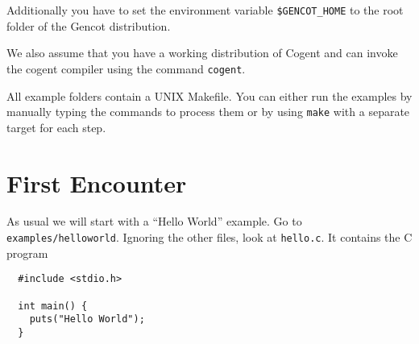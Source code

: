 \documentclass[a4paper]{report}
\newcommand{\code}[1]{\textnormal{\texttt{#1}}}
\begin{document}
Additionally you have to set the environment variable \code{\$GENCOT\_HOME} to the root folder of the Gencot
distribution.

We also assume that you have a working distribution of Cogent and can invoke the cogent compiler using the
command \code{cogent}.

All example folders contain a UNIX Makefile. You can either run the examples by manually typing the commands
to process them or by using \code{make} with a separate target for each step.

\section{First Encounter}
\label{intro-first}

As usual we will start with a ``Hello World'' example. Go to \code{examples/helloworld}. Ignoring the other files,
look at \code{hello.c}. It contains the C program
\begin{verbatim}
  #include <stdio.h>

  int main() {
    puts("Hello World");
  }
\end{verbatim}
\end{document}
